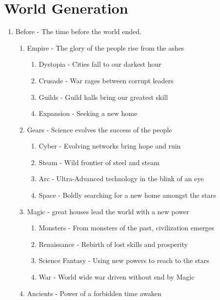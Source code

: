 \chapter{World Generation}
\begin{enumerate}
\item Before - The time before the world ended.  
	\begin{enumerate}
	\item Empire - The glory of the people rise from the ashes
		\begin{enumerate}
		\item Dystopia - Cities fall to our darkest hour
		\item Crusade - War rages between corrupt leaders
		\item Guilds - Guild halls bring our greatest skill
		\item Expansion - Seeking a new home
		\end{enumerate}
	\item Gears - Science evolves the success of the people
		\begin{enumerate}
		\item Cyber - Evolving networks bring hope and ruin
		\item Steam - Wild frontier of steel and steam
		\item Arc - Ultra-Advanced technology in the blink of an eye
		\item Space - Boldly searching for a new home amongst the stars
		\end{enumerate}
	\item Magic - great houses lead the world with a new power
		\begin{enumerate}
		\item Monsters - From monsters of the past, civilization emerges
		\item Renaissance - Rebirth of lost skills and prosperity
		\item Science Fantasy - Using new powers to reach to the stars
		\item War - World wide war driven without end by Magic
		\end{enumerate}
	\item Ancients - Power of a forbidden time awaken

\end{enumerate}
\end{enumerate}
